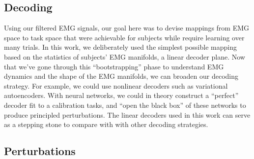\documentclass[../main.tex]{subfiles}
\begin{document}
\subsection{Decoding}


Using our filtered EMG signals, our goal here was to devise mappings from EMG space to task space that were achievable for subjects while require learning over many trials. In this work, we deliberately used the simplest possible mapping based on the statistics of subjects' EMG manifolds, a linear decoder plane. Now that we've gone through this ``bootstrapping'' phase to understand EMG dynamics and the shape of the EMG manifolds, we can broaden our decoding strategy. For example, we could use nonlinear decoders such as variational autoencoders\cite{vujaklijaOnlineMappingEMG2018}. With neural networks, we could in theory construct a ``perfect'' decoder fit to a calibration tasks, and ``open the black box'' of these networks to produce principled perturbations. The linear decoders used in this work can serve as a stepping stone to compare with with other decoding strategies.



\subsection{Perturbations}
\end{document}
